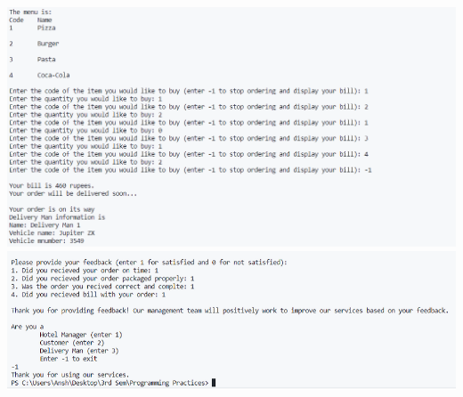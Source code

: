 \documentclass[12pt]{article}
\begin{document}
\includegraphics{out_5.png}\\
\includegraphics{out_6.png}\\
\end{document}
